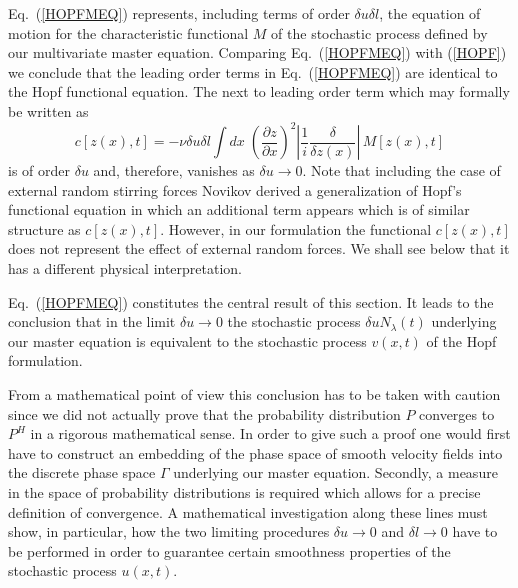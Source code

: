 Eq.~(\ref{HOPFMEQ}) 
represents, including terms of order $\delta u \delta l$,
the equation of motion for the characteristic
functional $M$ of the stochastic process defined by our
multivariate master
equation.  Comparing
Eq.~(\ref{HOPFMEQ}) with (\ref{HOPF}) we
conclude that the leading order terms in Eq.~(\ref{HOPFMEQ})
are identical
to the Hopf functional equation. The next to leading order
term which may
formally be written as
\begin{equation}
c[z(x),t] = - \nu \delta u \delta l \int dx \; \left(
\frac{\partial z}{\partial x} \right)^2 \left| \frac{1}{i}
\frac{\delta}{\delta z(x)} \right| \, M [z(x),t]
\end{equation}
is of order $\delta u$ and, therefore, vanishes as
$\delta u \longrightarrow 0$.
Note that including the case of external random stirring forces
Novikov derived a generalization\cite{NOVIKOV} of Hopf's
functional equation in which
an additional term appears which is
of similar structure as $c[z(x),t]$.
However, in our formulation the functional $c[z(x),t]$ does
not represent the
effect of external random forces. We shall see below that it
has a different physical interpretation.

Eq.~(\ref{HOPFMEQ}) constitutes the central result of this section.
It leads to the conclusion that in the limit
$\delta u \longrightarrow 0$
the stochastic process $\delta u N_{\lambda}(t)$ underlying our
master equation is equivalent to the stochastic process $v(x,t)$
of the Hopf formulation.

From a mathematical point of view this conclusion has to be
taken with
caution since we did not actually prove that the probability
distribution
$P$ converges to $P^H$ in a rigorous mathematical sense. In order to
give such a proof one would first have to construct an embedding of
the
phase space of smooth velocity fields into the
discrete phase space $\Gamma$ underlying our master equation.
Secondly,
a measure in the space of probability distributions is required
which
allows for a precise definition of convergence. A
mathematical investigation
along these lines must show, in particular, how the two
limiting procedures
$\delta u \rightarrow 0$ and $\delta l \rightarrow 0$ have to
be performed
in order to guarantee certain smoothness properties of the
stochastic
process $u(x,t)$.

